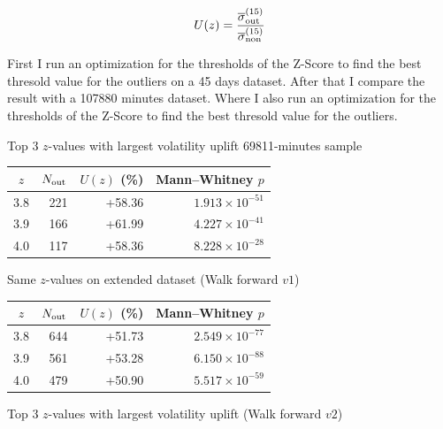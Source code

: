 \documentclass[12pt]{article}
\begin{document}
\begin{equation}\label{eq:vol_ratio}
U(z) =\frac{ \overline{\sigma}^{(15)}_{\rm out}}{\overline{\sigma}^{(15)}_{\rm non}}
\end{equation}


First I run an optimization for the thresholds of the Z-Score to find the best thresold value for the outliers on a 45 days dataset.
After that I compare the result with a 107880 minutes dataset. Where I also run an optimization for the thresholds of the Z-Score to find the best thresold value for the outliers.


Top 3 $z$-values with largest volatility uplift 69811-minutes sample

\begin{table}[H]
  \centering
  
  \label{tap:top3-z}
  \begin{tabular}{@{} c  r  r  r @{}}  
    \toprule
    $z$ & $N_{\rm out}$ & $U(z)$ (\%) & Mann–Whitney $p$ \\  
  \midrule
  3.8 & 221 &  +58.36 & $1.913\times10^{-51}$ \\  
  3.9 & 166 & +61.99 & $4.227\times10^{-41}$ \\  
  4.0 & 117 & +58.36 & $8.228\times10^{-28}$ \\ 
\bottomrule
\end{tabular}

\end{table}

Same $z$-values on extended dataset (Walk forward $v1$)

\begin{table}[H]
  \centering
  
  \label{tap:old-z-values-out-of-sample}
  \begin{tabular}{@{} c  r  r  r @{}}  
    \toprule
    $z$ & $N_{\rm out}$ & $U(z)$ (\%) & Mann–Whitney $p$ \\  
  \midrule
  3.8 & 644 & +51.73 & $2.549\times10^{-77}$ \\  
  3.9 & 561 & +53.28 & $6.150\times10^{-88}$ \\  
  4.0 & 479 & +50.90 & $5.517\times10^{-59}$ \\ 
\bottomrule
\end{tabular}

\end{table}





Top 3 $z$-values with largest volatility uplift (Walk forward $v2$)
\end{document}
